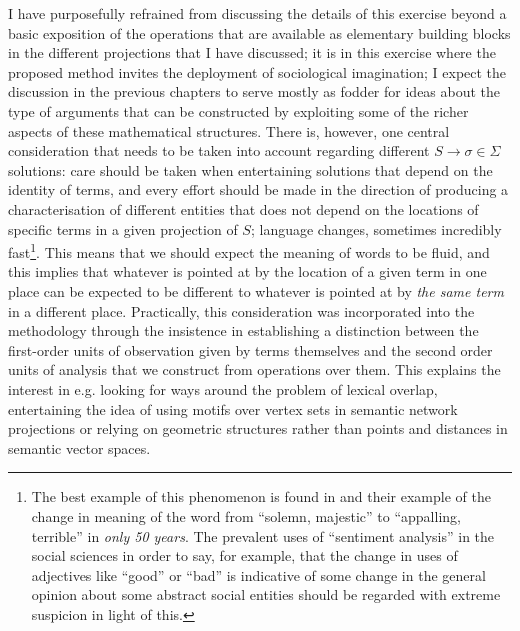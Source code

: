 I have purposefully refrained from discussing the details of this exercise beyond a basic exposition of the operations that are available as elementary building blocks in the different projections that I have discussed; it is in this exercise where the proposed method invites the deployment of sociological imagination; I expect the discussion in the previous chapters to serve mostly as fodder for ideas about the type of arguments that can be constructed by exploiting some of the richer aspects of these mathematical structures.
There is, however, one central consideration that needs to be taken into account regarding different $S \rightarrow \sigma \in \Sigma$ solutions: care should be taken when entertaining solutions that depend on the identity of terms, and every effort should be made in the direction of producing a characterisation of different entities that does not depend on the locations of specific terms in a given projection of $S$; language changes, sometimes incredibly fast\footnote{
    The best example of this phenomenon is found in \citet{hamilton2016} and their example of the change in meaning of the word  from ``solemn, majestic'' to ``appalling, terrible'' in \emph{only 50 years}.
    The prevalent uses of ``sentiment analysis'' in the social sciences in order to say, for example, that the change in uses of adjectives like ``good'' or ``bad'' is indicative of some change in the general opinion about some abstract social entities should be regarded with extreme suspicion in light of this.
}.
This means that we should expect the meaning of words to be fluid, and this implies that whatever is pointed at by the location of a given term in one place can be expected to be different to whatever is pointed at by \emph{the same term} in a different place.
Practically, this consideration was incorporated into the methodology through the insistence in establishing a distinction between the first-order units of observation given by terms themselves and the second order units of analysis that we construct from operations over them.
This explains the interest in e.g. looking for ways around the problem of lexical overlap, entertaining the idea of using motifs over vertex sets in semantic network projections or relying on geometric structures rather than points and distances in semantic vector spaces.

